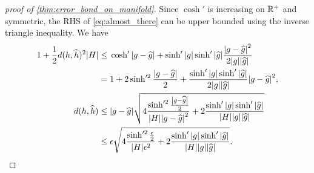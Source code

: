 \documentclass[english, a4paper, 12pt]{article}
\begin{document}
\begin{proof}[proof of \cref{thm:error_bond_on_manifold}]
	Since $\cosh'{}$ is increasing on $\mathbb{R}^+$ and symmetric, the RHS of \cref{eq:almost_there} can be upper bounded using the inverse triangle inequality.
	We have
	\begin{align}
	1 + \frac{1}{2} d(h, \widehat{h})^2 \abs{H} \leq{}&
		\cosh'{\abs{g - \widehat{g}}}
		+ \sinh'{\abs{g}} \sinh'{\abs{\widehat{g}}} \frac{\abs{g - \widehat{g}}^2}{2 \abs{g} \abs{\widehat{g}}}\\
	={}& 1 + 2 \sinh'^2{\frac{\abs{g - \widehat{g}}}{2}} + \frac{\sinh'{\abs{g}} \sinh'{\abs{\widehat{g}}}}{2 \abs{g} \abs{\widehat{g}}} \abs{g - \widehat{g}}^2,\\
	d(h, \widehat{h})
	\leq{}& \abs{g - \widehat{g}} \sqrt{
		4 \frac{\sinh'^2{\frac{\abs{g - \widehat{g}}}{2}}}{\abs{H} \abs{g - \widehat{g}}^2}
		+ 2 \frac{\sinh'{\abs{g}} \sinh'{\abs{\widehat{g}}}}{\abs{H} \abs{g} \abs{\widehat{g}}}
		}\\
	\leq{}& \epsilon \sqrt{
		4 \frac{\sinh'^2{\frac{\epsilon}{2}}}{\abs{H}\epsilon^2}
		+ 2 \frac{\sinh'{\abs{g}} \sinh'{\abs{\widehat{g}}}}{\abs{H} \abs{g} \abs{\widehat{g}}}
		}.
	\end{align}
\end{proof}
\end{document}

